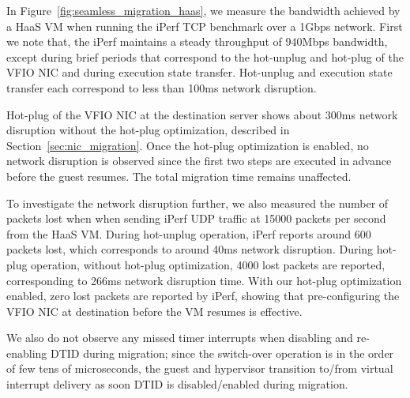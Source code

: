 In Figure~\ref{fig:seamless_migration_haas}, we measure
the bandwidth achieved by a HaaS VM
when running the iPerf TCP benchmark over a 1Gbps network.
First we note that, the iPerf maintains
a steady throughput of 940Mbps bandwidth,
except during brief periods that correspond to
the hot-unplug and hot-plug of
the VFIO NIC and during execution state transfer.
Hot-unplug and execution state transfer each correspond to
less than 100ms network disruption.

Hot-plug of the VFIO NIC at the destination server
shows about 300ms network disruption without
the hot-plug optimization, described in Section~\ref{sec:nic_migration}.
Once the hot-plug optimization is enabled, no
network disruption is observed
since the first two steps are executed in advance
before the guest resumes.
The total migration time remains unaffected.

To investigate the network disruption further, we also
measured the number of packets lost when when sending
iPerf UDP traffic at 15000 packets per second from the HaaS VM.
During hot-unplug operation,
iPerf reports around 600 packets lost, which corresponds to
around 40ms network disruption.
During hot-plug operation, without hot-plug optimization, 4000 lost
packets are reported, corresponding to 266ms network disruption time.
With our hot-plug optimization enabled, zero lost packets are reported
by iPerf, showing that pre-configuring the VFIO NIC at destination
before the VM resumes is effective.

We also do not observe any missed timer interrupts
when disabling and re-enabling DTID  during migration;
since the switch-over operation is in the order of few tens of microseconds,
the guest and hypervisor transition to/from virtual interrupt delivery
as soon DTID is disabled/enabled during migration.





